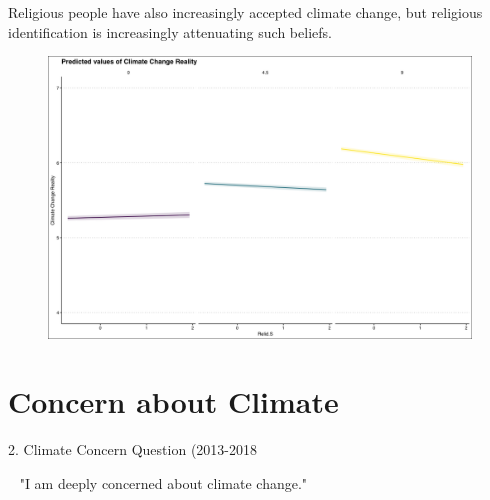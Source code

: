 \documentclass{beamer}
\begin{document}
\begin{frame}{Religious people have also increasingly accepted climate change, but religious identification is increasingly attenuating such beliefs.}
\begin{figure}
\includegraphics[width=.8\textwidth,height=\textheight,keepaspectratio]{Figures/REAL_RELIDS_T.png}
\end{figure}
\end{frame}


\section{Concern about Climate}
\begin{frame}{2. Climate Concern Question (2013-2018}
    

\begin{alertblock}{~}
"I am deeply concerned about climate change."
\end{alertblock}

\end{frame}
\end{document}
